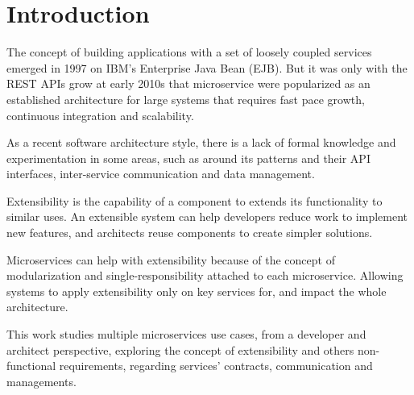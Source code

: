 

\chapter{Introduction}
\label{cap:introduction}

\enlargethispage{.5\baselineskip}

The concept of building applications with a set of loosely coupled services emerged in 1997 on IBM's Enterprise Java Bean (EJB). But it was only with the REST APIs grow at early 2010s that microservice were popularized as an established architecture for large systems that requires fast pace growth, continuous integration and scalability.

As a recent software architecture style, there is a lack of formal knowledge and experimentation in some areas, such as around its patterns and their API interfaces, inter-service communication and data management.

Extensibility is the capability of a component to extends its functionality to similar uses. An extensible system can help developers reduce work to implement new features, and architects reuse components to create simpler solutions.

Microservices can help with extensibility because of the concept of modularization and single-responsibility attached to each microservice. Allowing systems to apply extensibility only on key services for, and impact the whole architecture.

This work studies multiple microservices use cases, from a developer and architect perspective, exploring the concept of extensibility and others non-functional requirements, regarding services’ contracts, communication and managements.
